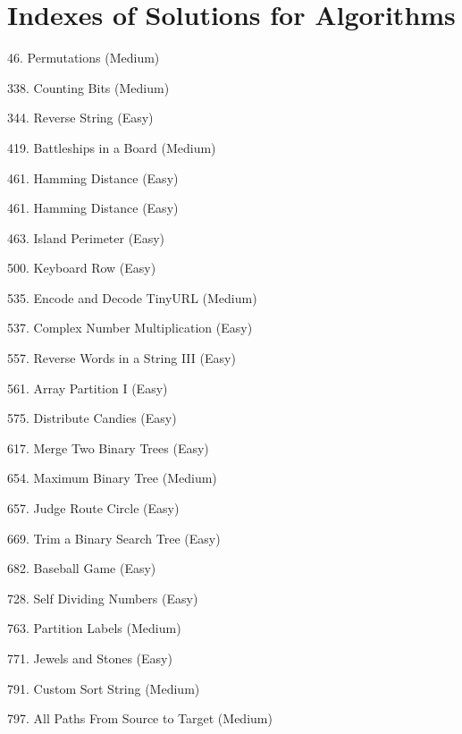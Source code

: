 \tocless\section{Indexes of Solutions for Algorithms}
\label{sec:algo_ind}

\begin{flushleft}
46. Permutations (Medium)\hfill\pageref{algo:46}

338. Counting Bits (Medium)\hfill\pageref{algo:338}

344. Reverse String (Easy)\hfill\pageref{algo:344}

419. Battleships in a Board (Medium)\hfill\pageref{algo:419}

461. Hamming Distance (Easy)\hfill\pageref{algo:461}

461. Hamming Distance (Easy)\hfill\pageref{algo:461}

463. Island Perimeter (Easy)\hfill\pageref{algo:463}

500. Keyboard Row (Easy)\hfill\pageref{algo:500}

535. Encode and Decode TinyURL (Medium)\hfill\pageref{algo:535}

537. Complex Number Multiplication (Easy)\hfill\pageref{algo:537}

557. Reverse Words in a String III (Easy)\hfill\pageref{algo:557}

561. Array Partition I (Easy)\hfill\pageref{algo:561}

575. Distribute Candies (Easy)\hfill\pageref{algo:575}

617. Merge Two Binary Trees (Easy)\hfill\pageref{algo:617}

654. Maximum Binary Tree (Medium)\hfill\pageref{algo:654}

657. Judge Route Circle (Easy)\hfill\pageref{algo:657}

669. Trim a Binary Search Tree (Easy)\hfill\pageref{algo:669}

682. Baseball Game (Easy)\hfill\pageref{algo:682}

728. Self Dividing Numbers (Easy)\hfill\pageref{algo:728}

763. Partition Labels (Medium)\hfill\pageref{algo:763}

771. Jewels and Stones (Easy)\hfill\pageref{algo:771}

791. Custom Sort String (Medium)\hfill\pageref{algo:791}

797. All Paths From Source to Target (Medium)\hfill\pageref{algo:797}


\end{flushleft}
